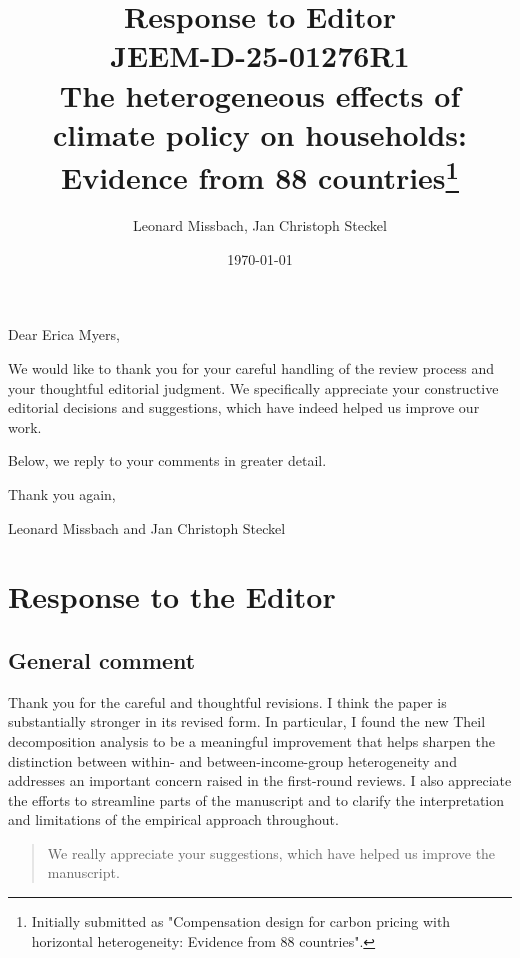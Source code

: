 \documentclass[11pt]{article}
\title{Response to Editor \\
\textbf{JEEM-D-25-01276R1} \\ 
The heterogeneous effects of climate policy on households: Evidence from 88 countries\footnote{Initially submitted as "Compensation design for carbon pricing with horizontal heterogeneity: Evidence from 88 countries".}
}
\author{Leonard Missbach, Jan Christoph Steckel}
\date{\today}
\newenvironment{response}
{\begin{quote}\color{black}}
{\end{quote}}
\begin{document}
\maketitle

\noindent Dear Erica Myers,

\noindent We would like to thank you for your careful handling of the review process and your thoughtful editorial judgment. We specifically appreciate your constructive editorial decisions and suggestions, which have indeed helped us improve our work. 

\noindent Below, we reply to your comments in greater detail. 

\noindent Thank you again,

\noindent Leonard Missbach and Jan Christoph Steckel

\newpage


\section*{Response to the Editor}

\subsection*{General comment}\label{comment_E_0}

\begin{commentbox}
    Thank you for the careful and thoughtful revisions. I think the paper is substantially stronger in its revised form. In particular, I found the new Theil decomposition analysis to be a meaningful improvement that helps sharpen the distinction between within- and between-income-group heterogeneity and addresses an important concern raised in the first-round reviews. I also appreciate the efforts to streamline parts of the manuscript and to clarify the interpretation and limitations of the empirical approach throughout.  

    
\end{commentbox}

\begin{response}
    We really appreciate your suggestions, which have helped us improve the manuscript.
\end{response}
\end{document}
